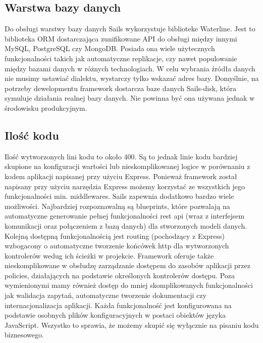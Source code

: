 \documentclass[12pt]{report}
\begin{document}
    \subsection{Warstwa bazy danych}
      Do obsługi warstwy bazy danych Sails wykorzystuje biblioteke Waterline.
      Jest to biblioteka ORM dostarczająca zunifikowane API do obsługi między innymi MySQL, PostgreSQL czy MongoDB.
      Posiada ona wiele użytecznych funkcjonalności takich jak automatyczne replikacje, czy nawet populowanie między bazami danych w różnych technologiach. 
      W celu wybrania źródła danych nie musimy ustawiać dialektu, wystarczy tylko wskazać adres bazy.
      Domyślnie, na potrzeby dewelopmentu framework dostarcza baze danych Sails-disk, która symuluje działania realnej bazy danych.
      Nie powinna być ona używana jednak w środowisku produkcyjnym.

    \subsection{Ilość kodu}
      Ilość wytworzonych lini kodu to około 400.
      Są to jednak linie kodu bardziej skupione na konfiguracji wartości lub nieskomplikowanej logice w porównaniu z kodem aplikacji napisanej przy użyciu Express.
      Ponieważ framework został napisany przy użyciu narzędzia Express możemy korzystać ze wszystkich jego funkcjonalności min. middlewares.
      Sails zapewnia dodatkowo bardzo wiele możliwości.
      Najbardziej rozpoznawalną są blueprints, które pozwalają na automatyczne generowanie pełnej funkcjonalności rest api (wraz z interfejsem komunikacji oraz połączeniem z bazą danych) dla stworzonych modeli danych.
      Kolejną dostępną funkcjonalnością jest routing (pochodzący z Express) wzbogacony o automatyczne tworzenie końcówek http dla wytworzonych kontrolerów wedug ich ścieżki w projekcie.
      Framework oferuje także nieskomplikowane w obsłudzę zarządzanie dostępem do zasobów aplikacji przez policies, działających na podstawie określonych kontrolerów dostępu.
      Poza wymienionymi mamy również dostęp do mniej skomplikowanych funkcjonalności jak walidacja zapytań, automatyczne tworzenie dokumentacji czy internacjonalizacja aplikacji.
      Każda funkcjonalność jest konfigurowana na podstawie osobnych plików konfiguracyjnych w postaci obiektów języka JavaScript.
      Wszystko to sprawia, że możemy skupić się wyłącznie na pisaniu kodu biznesowego.
\end{document}
